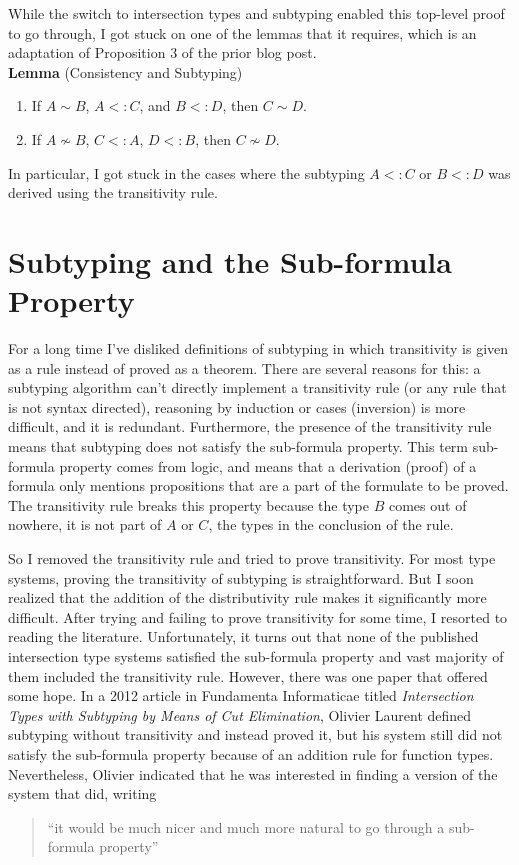 \documentclass{article}
\begin{document}
While the switch to intersection types and subtyping enabled this
top-level proof to go through, I got stuck on one of the lemmas that
it requires, which is an adaptation of Proposition 3 of the prior blog
post. \\

\noindent \textbf{Lemma} (Consistency and Subtyping)
\begin{enumerate}
\item  If $A \sim B$, $A <: C$, and $B <: D$,
  then $C \sim D$.
\item If $A \not\sim B$, $C <: A$, $D <: B$, then $C \not\sim D$.
\end{enumerate}
In particular, I got stuck in the cases where the subtyping $A <: C$
or $B <: D$ was derived using the transitivity rule.

\section{Subtyping and the Sub-formula Property}

For a long time I've disliked definitions of subtyping in which
transitivity is given as a rule instead of proved as a theorem.  There
are several reasons for this: a subtyping algorithm can't directly
implement a transitivity rule (or any rule that is not syntax
directed), reasoning by induction or cases (inversion) is more
difficult, and it is redundant. Furthermore, the presence of the
transitivity rule means that subtyping does not satisfy the sub-formula
property. This term sub-formula property comes from logic, and means
that a derivation (proof) of a formula only mentions propositions that
are a part of the formulate to be proved. The transitivity rule breaks
this property because the type $B$ comes out of nowhere, it is not
part of $A$ or $C$, the types in the conclusion of the rule.

So I removed the transitivity rule and tried to prove transitivity.
For most type systems, proving the transitivity of subtyping is
straightforward. But I soon realized that the addition of the
distributivity rule makes it significantly more difficult.  After
trying and failing to prove transitivity for some time, I resorted to
reading the literature. Unfortunately, it turns out that none of the
published intersection type systems satisfied the sub-formula property
and vast majority of them included the transitivity rule.  However,
there was one paper that offered some hope.  In a 2012 article in
Fundamenta Informaticae titled \emph{Intersection Types with Subtyping
  by Means of Cut Elimination}, Olivier Laurent defined subtyping
without transitivity and instead proved it, but his system still did
not satisfy the sub-formula property because of an addition rule for
function types. Nevertheless, Olivier indicated that he was interested
in finding a version of the system that did, writing
\begin{quote}
``it would be much nicer and much more natural to go through a
  sub-formula property''
\end{quote}
\end{document}
